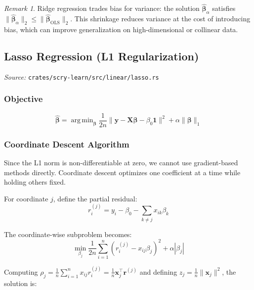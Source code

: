 \documentclass[11pt,a4paper]{article}
\theoremstyle{definition}
\theoremstyle{remark}
\newtheorem{remark}[theorem]{Remark}
\DeclareMathOperator*{\argmin}{arg\,min}
\begin{document}
\begin{remark}
Ridge regression trades bias for variance: the solution $\hat{\boldsymbol{\beta}}_\alpha$ satisfies $\|\hat{\boldsymbol{\beta}}_\alpha\|_2 \leq \|\hat{\boldsymbol{\beta}}_{\mathrm{OLS}}\|_2$. This shrinkage reduces variance at the cost of introducing bias, which can improve generalization on high-dimensional or collinear data.
\end{remark}

\subsection{Lasso Regression (L1 Regularization)}
\label{sec:lasso}

\noindent\textit{Source:} \texttt{crates/scry-learn/src/linear/lasso.rs}

\subsubsection*{Objective}
\begin{equation}
\hat{\boldsymbol{\beta}} = \argmin_{\boldsymbol{\beta}} \frac{1}{2n}\|\mathbf{y} - \mathbf{X}\boldsymbol{\beta} - \beta_0\mathbf{1}\|^2 + \alpha\|\boldsymbol{\beta}\|_1
\end{equation}

\subsubsection*{Coordinate Descent Algorithm}

Since the L1 norm is non-differentiable at zero, we cannot use gradient-based methods directly. Coordinate descent optimizes one coefficient at a time while holding others fixed.

For coordinate $j$, define the partial residual:
\begin{equation}
r_i^{(j)} = y_i - \beta_0 - \sum_{k \neq j} x_{ik}\beta_k
\end{equation}

The coordinate-wise subproblem becomes:
\begin{equation}
\min_{\beta_j} \frac{1}{2n}\sum_{i=1}^n (r_i^{(j)} - x_{ij}\beta_j)^2 + \alpha|\beta_j|
\end{equation}

Computing $\rho_j = \frac{1}{n}\sum_{i=1}^n x_{ij}r_i^{(j)} = \frac{1}{n}\mathbf{x}_j^\top\mathbf{r}^{(j)}$ and defining $z_j = \frac{1}{n}\|\mathbf{x}_j\|^2$, the solution is:
\end{document}
